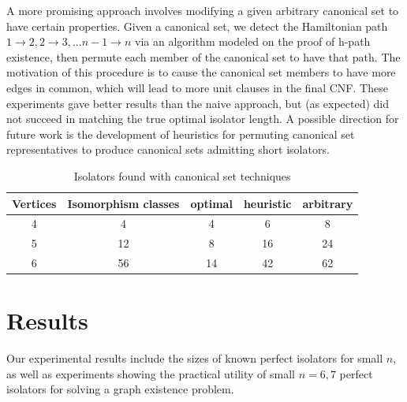 \documentclass[conference]{IEEEtran}
\begin{document}
A more promising approach involves modifying a given arbitrary canonical set to have certain properties. Given a canonical set, we detect the Hamiltonian path $1\rightarrow 2,2\rightarrow 3,... n-1\rightarrow n$ via an algorithm modeled on the proof of h-path existence, then permute each member of the canonical set to have that path. The motivation of this procedure is to cause the canonical set members to have more edges in common, which will lead to more unit clauses in the final CNF. These experiments gave better results than the naive approach, but (as expected) did not succeed in matching the true optimal isolator length. A possible direction for future work is the development of heuristics for permuting canonical set representatives to produce canonical sets admitting short isolators.

\begin{table}[ht]
    \centering
        \caption{Isolators found with canonical set techniques}
    \begin{tabular}{c|c|c|c|c}
        Vertices & Isomorphism classes & optimal & heuristic & arbitrary  \\ \hline
        4&4&4&6&8\\
        5&12&8&16&24\\ 
        6&56&14&42&62\\ 
    \end{tabular}

    \label{tab:canon_set}
\end{table}

\section{Results}

Our experimental results include the sizes of known perfect isolators for small $n$, as well as experiments showing the practical utility of small $n=6,7$ perfect isolators for solving a graph existence problem.
\end{document}

